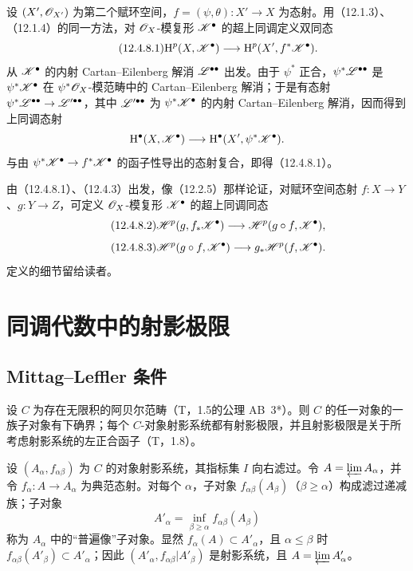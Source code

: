 设 $(X',\mathscr O_{X'})$ 为第二个赋环空间，$f=(\psi,\theta):X'\to X$ 为态射。用（12.1.3）、（12.1.4）的同一方法，对 $\mathscr O_X$-模复形 $\mathscr K^\bullet$ 的超上同调定义双同态
\begin{equation}\tag{12.4.8.1}
\mathrm H^p(X,\mathscr K^\bullet)\longrightarrow\mathrm H^p(X',f^*\mathscr K^\bullet).
\end{equation}
从 $\mathscr K^\bullet$ 的内射 Cartan--Eilenberg 解消 $\mathscr L^{\bullet\bullet}$ 出发。由于 $\psi^*$ 正合，$\psi^*\mathscr L^{\bullet\bullet}$ 是 $\psi^*\mathscr K^\bullet$ 在 $\psi^*\mathscr O_X$-模范畴中的 Cartan--Eilenberg 解消；于是有态射 $\psi^*\mathscr L^{\bullet\bullet}\to\mathscr L'^{\bullet\bullet}$，其中 $\mathscr L'^{\bullet\bullet}$ 为 $\psi^*\mathscr K^\bullet$ 的内射 Cartan--Eilenberg 解消，因而得到上同调态射
\[
\mathrm H^\bullet(X,\mathscr K^\bullet)\longrightarrow\mathrm H^\bullet(X',\psi^*\mathscr K^\bullet).
\]
与由 $\psi^*\mathscr K^\bullet\to f^*\mathscr K^\bullet$ 的函子性导出的态射复合，即得（12.4.8.1）。

由（12.4.8.1）、（12.4.3）出发，像（12.2.5）那样论证，对赋环空间态射 $f:X\to Y$、$g:Y\to Z$，可定义 $\mathscr O_X$-模复形 $\mathscr K^\bullet$ 的超上同调同态
\begin{equation}\tag{12.4.8.2}
\mathscr H^p(g,f_*\mathscr K^\bullet)\longrightarrow\mathscr H^p(g\circ f,\mathscr K^\bullet),
\end{equation}
\begin{equation}\tag{12.4.8.3}
\mathscr H^p(g\circ f,\mathscr K^\bullet)\longrightarrow g_*\mathscr H^p(f,\mathscr K^\bullet).
\end{equation}
定义的细节留给读者。\par

\section{同调代数中的射影极限}
\subsection{Mittag--Leffler 条件}
设 $C$ 为存在无限积的阿贝尔范畴（T，1.5的公理 AB~3*）。则 $C$ 的任一对象的一族子对象有下确界；每个 $C$-对象射影系统都有射影极限，并且射影极限是关于所考虑射影系统的左正合函子（T，1.8）。

设 $(A_\alpha,f_{\alpha\beta})$ 为 $C$ 的对象射影系统，其指标集 $I$ 向右滤过。令 $A=\varprojlim A_\alpha$，并令 $f_\alpha:A\to A_\alpha$ 为典范态射。对每个 $\alpha$，子对象 $f_{\alpha\beta}(A_\beta)$（$\beta\geq\alpha$）构成滤过递减族；子对象
\[
A'_\alpha=\inf_{\beta\geq\alpha}f_{\alpha\beta}(A_\beta)
\]
称为 $A_\alpha$ 中的“普遍像”子对象。显然 $f_\alpha(A)\subset A'_\alpha$，且 $\alpha\leq\beta$ 时 $f_{\alpha\beta}(A'_\beta)\subset A'_\alpha$；因此 $(A'_\alpha,f_{\alpha\beta}|A'_\beta)$ 是射影系统，且 $A=\varprojlim A'_\alpha$。

